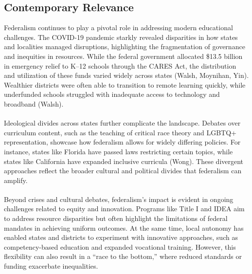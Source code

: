 \documentclass[11pt]{extarticle}
\begin{document}
\subsection{Contemporary Relevance}
Federalism continues to play a pivotal role in addressing modern educational challenges. The COVID-19 pandemic starkly revealed disparities in how states and localities managed disruptions, highlighting the fragmentation of governance and inequities in resources. While the federal government allocated \$13.5 billion in emergency relief to K–12 schools through the CARES Act, the distribution and utilization of these funds varied widely across states (Walsh, Moynihan, Yin). Wealthier districts were often able to transition to remote learning quickly, while underfunded schools struggled with inadequate access to technology and broadband (Walsh).\\
\\
Ideological divides across states further complicate the landscape. Debates over curriculum content, such as the teaching of critical race theory and LGBTQ+ representation, showcase how federalism allows for widely differing policies. For instance, states like Florida have passed laws restricting certain topics, while states like California have expanded inclusive curricula (Wong). These divergent approaches reflect the broader cultural and political divides that federalism can amplify.\\
\\
Beyond crises and cultural debates, federalism’s impact is evident in ongoing challenges related to equity and innovation. Programs like Title I and IDEA aim to address resource disparities but often highlight the limitations of federal mandates in achieving uniform outcomes. At the same time, local autonomy has enabled states and districts to experiment with innovative approaches, such as competency-based education and expanded vocational training. However, this flexibility can also result in a “race to the bottom,” where reduced standards or funding exacerbate inequalities.
\end{document}
